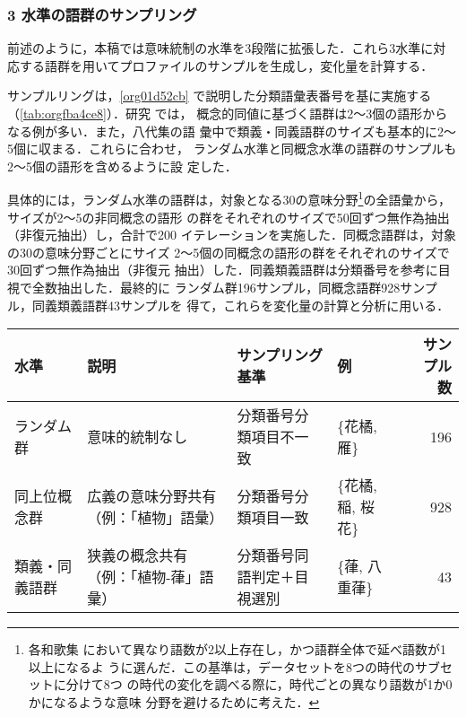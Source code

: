 \documentclass[submit]{ipsj}
\renewcommand{\ref}{\cref}
\begin{document}
\subsubsection{3 水準の語群のサンプリング\label{org46fa41c}}
\label{sec:org90fc769}
前述のように，本稿では意味統制の水準を3段階に拡張した．これら3水準に対
応する語群を用いてプロファイルのサンプルを生成し，変化量を計算する．

サンプルリングは，\ref{org01d52cb} で説明した分類語彙表番号を基に実施する
（\ref{tab:orgfba4ce8}）．研究 \cite{Speelman2003Profilebased} では，
概念的同値に基づく語群は2～3個の語形からなる例が多い．また，八代集の語
彙中で類義・同義語群のサイズも基本的に2～5個に収まる．これらに合わせ，
ランダム水準と同概念水準の語群のサンプルも2～5個の語形を含めるように設
定した．

具体的には，ランダム水準の語群は，対象となる30の意味分野\footnote{各和歌集
において異なり語数が2以上存在し，かつ語群全体で延べ語数が1以上になるよ
うに選んだ．この基準は，データセットを8つの時代のサブセットに分けて8つ
の時代の変化を調べる際に，時代ごとの異なり語数が1か0かになるような意味
分野を避けるために考えた．}の全語彙から，サイズが2～5の非同概念の語形
の群をそれぞれのサイズで50回ずつ無作為抽出（非復元抽出）し，合計で200
イテレーションを実施した．同概念語群は，対象の30の意味分野ごとにサイズ
2～5個の同概念の語形の群をそれぞれのサイズで30回ずつ無作為抽出（非復元
抽出）した．同義類義語群は分類番号を参考に目視で全数抽出した．最終的に
ランダム群196サンプル，同概念語群928サンプル，同義類義語群43サンプルを
得て，これらを変化量の計算と分析に用いる．

\begin{table*}[tb]
\caption{\label{tab:orgfba4ce8}3水準の語形集合のサンプル例}
\centering
\begin{tabular}{llllr}
水準 & 説明 & サンプリング基準 & 例 & サンプル数\\
\hline
ランダム群 & 意味的統制なし & 分類番号分類項目不一致 & \{花橘, 雁\} & 196\\
同上位概念群 & 広義の意味分野共有（例：「植物」語彙） & 分類番号分類項目一致 & \{花橘, 稲, 桜花\} & 928\\
類義・同義語群 & 狭義の概念共有（例：「植物-葎」語彙） & 分類番号同語判定＋目視選別 & \{葎, 八重葎\} & 43\\
\end{tabular}
\end{table*}
\end{document}
